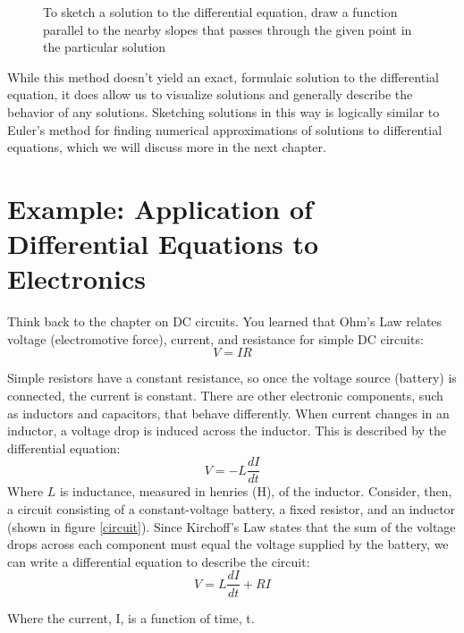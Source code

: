 \begin{figure}[htbp]
    \caption{To sketch a solution to the differential equation, draw a function 
    parallel to the nearby slopes that passes through the given point in the 
    particular solution}
    \label{slopefield5}
\end{figure}

While this method doesn't yield an exact, formulaic solution to the 
differential equation, it does allow us to visualize solutions and generally 
describe the behavior of any solutions. Sketching solutions in this way is 
logically similar to Euler's method for finding numerical approximations of 
solutions to differential equations, which we will discuss more in the next 
chapter. 

\section{Example: Application of Differential Equations to Electronics}
Think back to the chapter on DC circuits. You learned that Ohm's Law relates 
voltage (electromotive force), current, and resistance for simple DC circuits:
$$V = IR$$

Simple resistors have a constant resistance, so once the voltage source 
(battery) is connected, the current is constant. There are other electronic 
components, such as inductors and capacitors, that behave differently. When 
current changes in an inductor, a voltage drop is induced across the inductor. 
This is described by the differential equation:
$$V = -L\frac{dI}{dt}$$
Where $L$ is inductance, measured in henries (H), of the inductor. Consider, 
then, a circuit consisting of a constant-voltage battery, a fixed resistor, 
and an inductor (shown in figure \ref{circuit}). Since Kirchoff's Law states 
that the sum of the voltage drops across each component must equal the voltage 
supplied by the battery, we can write a differential equation to describe the 
circuit:
$$V = L\frac{dI}{dt} + RI$$

Where the current, I, is a function of time, t. 


